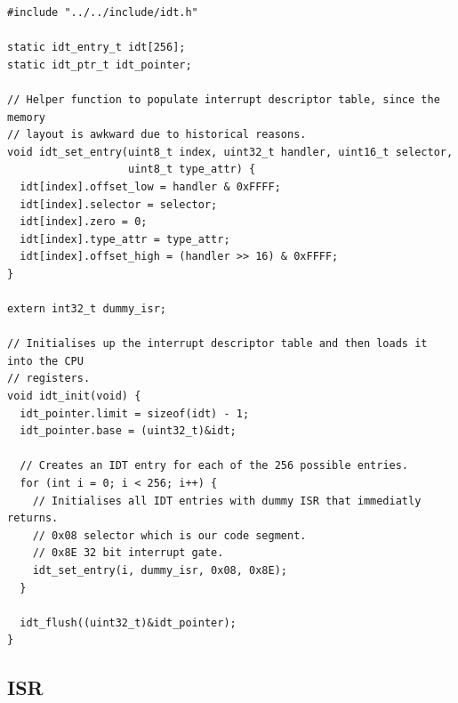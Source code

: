 \documentclass[../main.tex]{subfiles}
\begin{document}
\label{lst:idt_c}
\begin{verbatim}
#include "../../include/idt.h"

static idt_entry_t idt[256];
static idt_ptr_t idt_pointer;

// Helper function to populate interrupt descriptor table, since the memory
// layout is awkward due to historical reasons.
void idt_set_entry(uint8_t index, uint32_t handler, uint16_t selector,
                   uint8_t type_attr) {
  idt[index].offset_low = handler & 0xFFFF;
  idt[index].selector = selector;
  idt[index].zero = 0;
  idt[index].type_attr = type_attr;
  idt[index].offset_high = (handler >> 16) & 0xFFFF;
}

extern int32_t dummy_isr;

// Initialises up the interrupt descriptor table and then loads it into the CPU
// registers.
void idt_init(void) {
  idt_pointer.limit = sizeof(idt) - 1;
  idt_pointer.base = (uint32_t)&idt;

  // Creates an IDT entry for each of the 256 possible entries.
  for (int i = 0; i < 256; i++) {
    // Initialises all IDT entries with dummy ISR that immediatly returns.
    // 0x08 selector which is our code segment.
    // 0x8E 32 bit interrupt gate.
    idt_set_entry(i, dummy_isr, 0x08, 0x8E);
  }

  idt_flush((uint32_t)&idt_pointer);
}

\end{verbatim}


\subsection{ISR}
\label{apx:isr}
\end{document}
